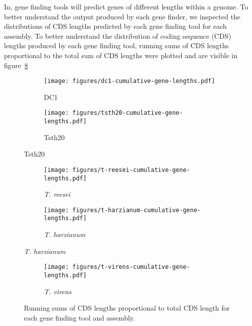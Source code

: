 In, gene finding tools will predict genes of different lengths within
a genome. To better understand the output produced by each gene
finder, we inspected the distributions of CDS lengths predicted by
each gene finding tool for each assembly. To better understand the
distribution of coding sequence (CDS) lengths produced by each gene
finding tool, running sums of CDS lengths proportional to the total
sum of CDS lengths were plotted and are visible in
figure~\ref{fig:cds-lengths}

\begin{figure}
  \centering
    \begin{subfigure}{0.8\textwidth}
      \texttt{[image: figures/dc1-cumulative-gene-lengths.pdf]}
      \label{fig:dc1-lengths}
      \caption{DC1}
    \end{subfigure}
    \begin{subfigure}{0.8\textwidth}
      \texttt{[image: figures/tsth20-cumulative-gene-lengths.pdf]}
      \label{fig:tsth20-lengths}
      \caption{Tsth20}
    \end{subfigure}
\end{figure}
\begin{figure}[ht]
  \ContinuedFloat
  \centering
    \begin{subfigure}{0.8\textwidth}
      \texttt{[image: figures/t-reesei-cumulative-gene-lengths.pdf]}
      \label{fig:treesei-lengths}
      \caption{\textit{T. reesei}}
    \end{subfigure}
    \begin{subfigure}{0.8\textwidth}
      \texttt{[image: figures/t-harzianum-cumulative-gene-lengths.pdf]}
      \label{fig:tharzianum-lengths}
      \caption{\textit{T. harzianum}}
    \end{subfigure}
\end{figure}
\begin{figure}[ht]
  \ContinuedFloat
  \centering
    \begin{subfigure}{0.8\textwidth}
      \texttt{[image: figures/t-virens-cumulative-gene-lengths.pdf]}
      \label{fig:tvirens-lengths}
      \caption{\textit{T. virens}}
    \end{subfigure}
  \label{fig:cds-lengths}
  \caption{Running sums of CDS lengths proportional to total CDS
    length for each gene finding tool and assembly.}
\end{figure}
